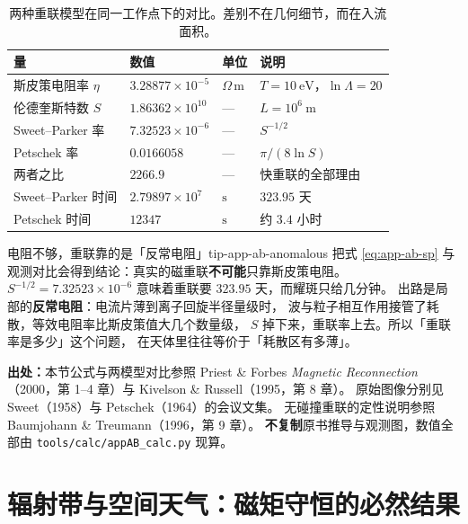\begin{table}[htbp]
\centering
\small
\caption{两种重联模型在同一工作点下的对比。差别不在几何细节，而在入流面积。}
\label{tab:app-ab-reconnection}
\begin{tabular}{p{3.2cm}p{3.0cm}p{3.2cm}p{3.8cm}}
\toprule
量 & 数值 & 单位 & 说明 \\
\midrule
斯皮策电阻率 $\eta$ & $3.28877\times10^{-5}$ & $\Omega\,\mathrm{m}$ & $T=10\ \mathrm{eV}$，$\ln\Lambda=20$ \\
伦德奎斯特数 $S$ & $1.86362\times10^{10}$ & --- & $L=10^6\ \mathrm{m}$ \\
Sweet--Parker 率 & $7.32523\times10^{-6}$ & --- & $S^{-1/2}$ \\
Petschek 率 & $0.0166058$ & --- & $\pi/(8\ln S)$ \\
两者之比 & $2266.9$ & --- & 快重联的全部理由 \\
Sweet--Parker 时间 & $2.79897\times10^{7}$ & $\mathrm{s}$ & $323.95$ 天 \\
Petschek 时间 & $12347$ & $\mathrm{s}$ & 约 $3.4$ 小时 \\
\bottomrule
\end{tabular}

\end{table}

\begin{tip}{电阻不够，重联靠的是「反常电阻」}{tip-app-ab-anomalous}
把式 \eqref{eq:app-ab-sp} 与观测对比会得到结论：真实的磁重联\textbf{不可能}只靠斯皮策电阻。
$S^{-1/2}=7.32523\times10^{-6}$ 意味着重联要 $323.95$ 天，而耀斑只给几分钟。
出路是局部的\textbf{反常电阻}：电流片薄到离子回旋半径量级时，
波与粒子相互作用接管了耗散，等效电阻率比斯皮策值大几个数量级，
$S$ 掉下来，重联率上去。所以「重联率是多少」这个问题，
在天体里往往等价于「耗散区有多薄」。
\end{tip}

{\footnotesize
\textbf{出处：}本节公式与两模型对比参照 Priest \& Forbes \emph{Magnetic Reconnection}
（2000，第 1--4 章）与 Kivelson \& Russell（1995，第 8 章）。
原始图像分别见 Sweet（1958）与 Petschek（1964）的会议文集。
无碰撞重联的定性说明参照 Baumjohann \& Treumann（1996，第 9 章）。
\textbf{不复制}原书推导与观测图，数值全部由 \texttt{tools/\allowbreak{}calc/\allowbreak{}appAB\_calc.py} 现算。
}

\section{辐射带与空间天气：磁矩守恒的必然结果}
\label{sec:app-ab-radbelt}

